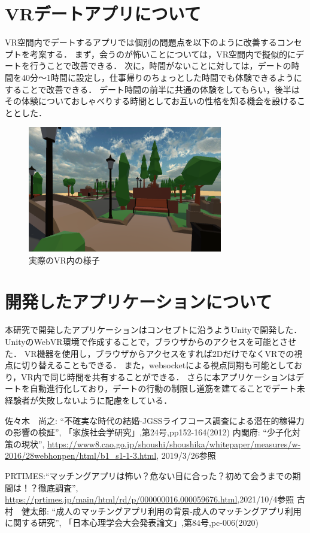 \documentclass[twocolumn,10pt,a4j]{ltjsarticle}
\begin{document}
\section{VRデートアプリについて}
VR空間内でデートするアプリでは個別の問題点を以下のように改善するコンセプトを考案する．
まず，会うのが怖いことについては，VR空間内で擬似的にデートを行うことで改善できる．
次に，時間がないことに対しては，デートの時間を40分〜1時間に設定し，仕事帰りのちょっとした時間でも体験できるようにすることで改善できる．
デート時間の前半に共通の体験をしてもらい，後半はその体験についておしゃべりする時間としてお互いの性格を知る機会を設けることとした．
\begin{figure}[h]
\begin{center}
\includegraphics[clip,width=85mm,height=55mm]{apurinaigazou.png}
\end{center}
 \caption{実際のVR内の様子}
\end{figure}

\section{開発したアプリケーションについて}
本研究で開発したアプリケーションはコンセプトに沿うようUnityで開発した．
UnityのWebVR環境で作成することで，ブラウザからのアクセスを可能とさせた．
VR機器を使用し，ブラウザからアクセスをすれば2DだけでなくVRでの視点に切り替えることもできる．
また，websocketによる視点同期も可能としており，VR内で同じ時間を共有することができる．
さらに本アプリケーションはデートを自動進行化しており，デートの行動の制限し道筋を建てることでデート未経験者が失敗しないように配慮をしている．


\begin{thebibliography}{99}
 佐々木　尚之: ``不確実な時代の結婚-JGSSライフコース調査による潜在的稼得力の影響の検証'', 「家族社会学研究」,第24号,pp152-164(2012)
 内閣府: ``少子化対策の現状'', \url{https://www8.cao.go.jp/shoushi/shoushika/whitepaper/measures/w-2016/28webhonpen/html/b1_s1-1-3.html}, 2019/3/26参照


PRTIMES:``マッチングアプリは怖い？危ない目に合った？初めて会うまでの期間は！？徹底調査'',
\url{https://prtimes.jp/main/html/rd/p/000000016.000059676.html},2021/10/4参照
 古村　健太郎: ``成人のマッチングアプリ利用の背景-成人のマッチングアプリ利用に関する研究'', 「日本心理学会大会発表論文」,第84号,pc-006(2020)

\end{thebibliography}
\end{document}
